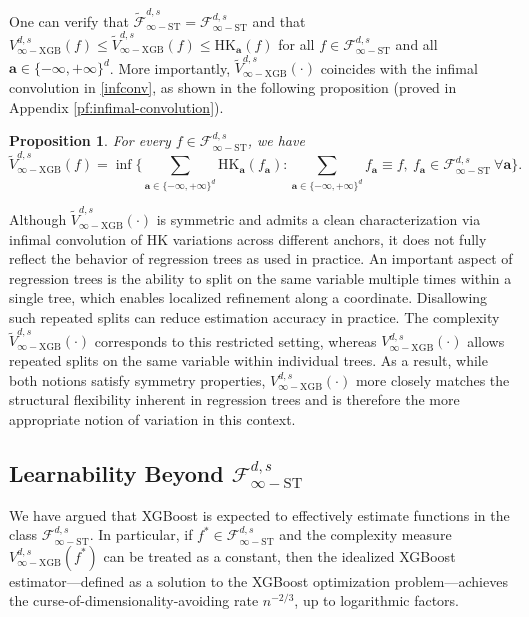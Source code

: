 \documentclass[10pt]{article}
\newtheorem{proposition}{Proposition}
\newcommand{\fstinf}{{\mathcal{F}^{d, s}_{\infty-\text{ST}}}}
\newcommand{\oldfstinf}{{\widetilde{\mathcal{F}}^{d, s}_{\infty-\text{ST}}}}
\newcommand{\vinfxgb}{{V^{d, s}_{\infty-\text{XGB}}}}
\newcommand{\oldvinfxgb}{{\widetilde{V}^{d, s}_{\infty-\text{XGB}}}}
\newcommand{\hk}{{\text{HK}}}
\newcommand{\abf}{{\mathbf{a}}}
\begin{document}
One can verify that $\oldfstinf = \fstinf$ and that 
$\vinfxgb(f) \le \oldvinfxgb(f) \le \hk_{\abf}(f)$ for all 
$f \in \fstinf$ and all $\abf \in \{-\infty, +\infty\}^d$. More 
importantly, $\oldvinfxgb(\cdot)$ coincides with the infimal 
convolution in \eqref{infconv}, as shown in the following proposition
(proved in Appendix \ref{pf:infimal-convolution}).

\begin{proposition}\label{prop:infimal-convolution}
    For every $f \in \fstinf$, we have
    \begin{equation*}
        \oldvinfxgb(f) 
        = \inf \Big\{\sum_{\abf \in \{-\infty, +\infty\}^d} 
        \hk_{\abf}(f_{\abf}): 
        \sum_{\abf \in \{-\infty, +\infty\}^d} f_{\abf} \equiv f,
        \ f_{\abf} \in \fstinf \ \forall \abf\Big\}.
    \end{equation*}
\end{proposition}

Although $\oldvinfxgb(\cdot)$ is symmetric and admits a clean
characterization via infimal convolution of HK variations across
different anchors, it does not fully reflect the behavior of
regression trees as used in practice. An important aspect of
regression trees is the ability to split on the same variable 
multiple times within a single tree, which enables localized 
refinement along a coordinate. Disallowing such repeated splits can 
reduce estimation accuracy in practice. The complexity 
$\oldvinfxgb(\cdot)$ corresponds to this restricted setting, 
whereas $\vinfxgb(\cdot)$ allows repeated splits on the same 
variable within individual trees. As a result, while both notions 
satisfy symmetry properties, $\vinfxgb(\cdot)$ more closely matches 
the structural flexibility inherent in regression trees and is 
therefore the more appropriate notion of variation in this context.


\subsection{Learnability Beyond $\fstinf$}\label{notfstinf}

We have argued that XGBoost is expected to effectively estimate
functions in the class $\fstinf$. In particular, if $f^* \in \fstinf$
and the complexity measure $\vinfxgb(f^*)$ can be treated as a constant, then
the idealized XGBoost estimator—defined as a solution to the XGBoost 
optimization problem—achieves the curse-of-dimensionality-avoiding 
rate $n^{-2/3}$, up to logarithmic factors.
\end{document}
